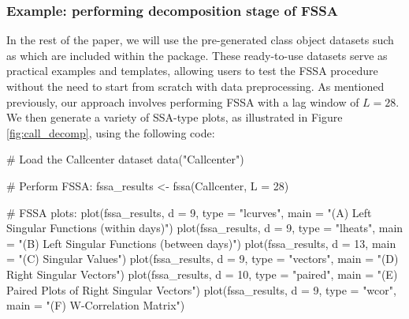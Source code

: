 \subsubsection{Example: performing decomposition stage of FSSA}
In the rest of the paper, we will use  the pre-generated  class object datasets such as 
 which are included within the package. These ready-to-use datasets serve as practical 
examples and templates, allowing users to test the FSSA procedure without the need 
to start from scratch with data preprocessing.
As mentioned previously, our approach involves performing FSSA with a lag window of 
$L=28$. We then generate a variety of SSA-type plots, as illustrated in Figure 
\ref{fig:call_decomp}, using the following code:
\begin{example}
# Load the Callcenter dataset
data("Callcenter")

# Perform FSSA:
fssa_results <- fssa(Callcenter, L = 28)

# FSSA plots:
plot(fssa_results, d = 9, type = "lcurves", 
	main = "(A) Left Singular Functions (within days)")
plot(fssa_results, d = 9, type = "lheats",
	main = "(B) Left Singular Functions (between days)")
plot(fssa_results, d = 13, main = "(C) Singular Values")
plot(fssa_results, d = 9, type = "vectors",
	main = "(D) Right Singular Vectors")
plot(fssa_results, d = 10, type = "paired",
	main = "(E) Paired Plots of Right Singular Vectors")
plot(fssa_results, d = 9, type = "wcor",
	main = "(F) W-Correlation Matrix")
\end{example}

